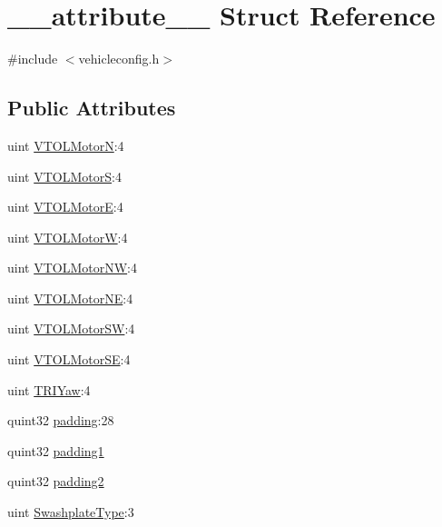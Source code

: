 \hypertarget{struct____attribute____}{\section{\-\_\-\-\_\-attribute\-\_\-\-\_\- Struct Reference}
\label{struct____attribute____}
}


{\ttfamily \#include $<$vehicleconfig.\-h$>$}

\subsection*{Public Attributes}
\begin{DoxyCompactItemize}
\item 
uint \hyperlink{group___config_plugin_ga2f7517413dcc58e5033f5b558c2645b6}{V\-T\-O\-L\-Motor\-N}\-:4
\item 
uint \hyperlink{group___config_plugin_ga454ee04b612bfb51636328cac0ecb30c}{V\-T\-O\-L\-Motor\-S}\-:4
\item 
uint \hyperlink{group___config_plugin_ga98abc446e1dcba498787f381659f6b2d}{V\-T\-O\-L\-Motor\-E}\-:4
\item 
uint \hyperlink{group___config_plugin_ga702b69e8ffd06d1a761e28540e0706c0}{V\-T\-O\-L\-Motor\-W}\-:4
\item 
uint \hyperlink{group___config_plugin_gaad074461234c2de58881eb8f2923e6e7}{V\-T\-O\-L\-Motor\-N\-W}\-:4
\item 
uint \hyperlink{group___config_plugin_gab2efff1f0b5cdb98443f986d78f75691}{V\-T\-O\-L\-Motor\-N\-E}\-:4
\item 
uint \hyperlink{group___config_plugin_ga6c7dfd25d7944b3ce84871fed9c6c9ef}{V\-T\-O\-L\-Motor\-S\-W}\-:4
\item 
uint \hyperlink{group___config_plugin_gaa954495952cf0b6ae1f8a25d95ca09c0}{V\-T\-O\-L\-Motor\-S\-E}\-:4
\item 
uint \hyperlink{group___config_plugin_ga63632c414ddd0db93282a775cff6ee2b}{T\-R\-I\-Yaw}\-:4
\item 
quint32 \hyperlink{group___config_plugin_gae439ab85c005f3400498997049fd50e8}{padding}\-:28
\item 
quint32 \hyperlink{group___config_plugin_ga1d4a76a1f0c36316d50d1ae3f788ef4e}{padding1}
\item 
quint32 \hyperlink{group___config_plugin_ga445d386b31eb43aafbd971345a5b221e}{padding2}
\item 
uint \hyperlink{group___config_plugin_ga4f96550cdd283e7bb8b8fb7ec7d3cc09}{Swashplate\-Type}\-:3

\end{DoxyCompactItemize}
